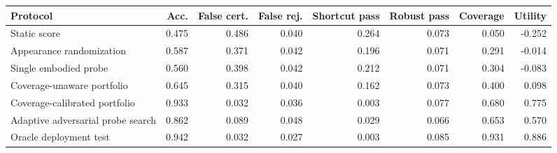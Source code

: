 \begin{tabular}{lrrrrrrr}
\toprule
Protocol & Acc. & False cert. & False rej. & Shortcut pass & Robust pass & Coverage & Utility \\
\midrule
Static score & 0.475 & 0.486 & 0.040 & 0.264 & 0.073 & 0.050 & -0.252 \\
Appearance randomization & 0.587 & 0.371 & 0.042 & 0.196 & 0.071 & 0.291 & -0.014 \\
Single embodied probe & 0.560 & 0.398 & 0.042 & 0.212 & 0.071 & 0.304 & -0.083 \\
Coverage-unaware portfolio & 0.645 & 0.315 & 0.040 & 0.162 & 0.073 & 0.400 & 0.098 \\
Coverage-calibrated portfolio & 0.933 & 0.032 & 0.036 & 0.003 & 0.077 & 0.680 & 0.775 \\
Adaptive adversarial probe search & 0.862 & 0.089 & 0.048 & 0.029 & 0.066 & 0.653 & 0.570 \\
Oracle deployment test & 0.942 & 0.032 & 0.027 & 0.003 & 0.085 & 0.931 & 0.886 \\
\bottomrule
\end{tabular}
